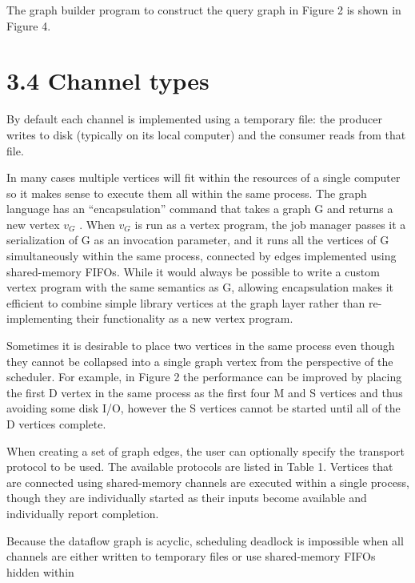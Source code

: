 \documentclass[
]{article}
\begin{document}
The graph builder program to construct the query graph in Figure 2 is
shown in Figure 4.

\section{3.4 Channel types}\label{channel-types}

By default each channel is implemented using a temporary file: the
producer writes to disk (typically on its local computer) and the
consumer reads from that file.

In many cases multiple vertices will fit within the resources of a
single computer so it makes sense to execute them all within the same
process. The graph language has an ``encapsulation'' command that takes
a graph G and returns a new vertex \(v_{G}\) . When \(v_{G}\) is run as
a vertex program, the job manager passes it a serialization of G as an
invocation parameter, and it runs all the vertices of G simultaneously
within the same process, connected by edges implemented using
shared-memory FIFOs. While it would always be possible to write a custom
vertex program with the same semantics as G, allowing encapsulation
makes it efficient to combine simple library vertices at the graph layer
rather than re-implementing their functionality as a new vertex program.

Sometimes it is desirable to place two vertices in the same process even
though they cannot be collapsed into a single graph vertex from the
perspective of the scheduler. For example, in Figure 2 the performance
can be improved by placing the first D vertex in the same process as the
first four M and S vertices and thus avoiding some disk I/O, however the
S vertices cannot be started until all of the D vertices complete.

When creating a set of graph edges, the user can optionally specify the
transport protocol to be used. The available protocols are listed in
Table 1. Vertices that are connected using shared-memory channels are
executed within a single process, though they are individually started
as their inputs become available and individually report completion.

Because the dataflow graph is acyclic, scheduling deadlock is impossible
when all channels are either written to temporary files or use
shared-memory FIFOs hidden within
\end{document}
